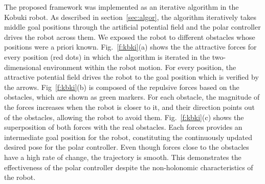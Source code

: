 \documentclass[conference]{IEEEtran}
\begin{document}
The proposed framework was implemented as an iterative algorithm in the Kobuki
robot. As described in section~\ref{sec:algor}, the algorithm iteratively takes
middle goal positions through the artificial potential field and the polar
controller drives the robot across them. We exposed the robot to different
obstacles whose positions were a priori known.
Fig.~\ref{f:kbki}(a) shows the the attractive forces for every position (red
dots) in which the algorithm is iterated in the two-dimensional environment
within the robot motion. For every position, the attractive potential field
drives the robot to the goal position which is verified by the arrows.
Fig~\ref{f:kbki}(b) is composed of the repulsive forces based on the obstacles,
which are shown as green markers.
For each obstacle, the magnitude of the forces increases when the robot is
closer to it, and their direction points out of the obstacles, allowing the
robot to avoid them. Fig.~\ref{f:kbki}(c) shows the superposition of both
forces with the real obstacles. Each forces provides an intermediate goal
position for the robot, constituting the continuously updated desired pose for
the polar controller. Even though forces close to the obstacles have a high
rate of change, the trajectory is smooth. This demonstrates the effectiveness of
the polar controller despite the non-holonomic characteristics of the robot.
\end{document}
